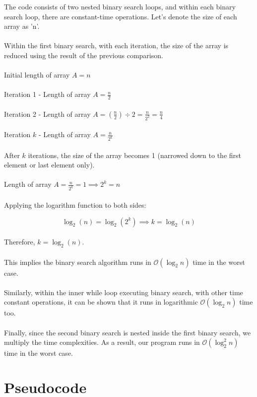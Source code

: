 \documentclass{article}
\begin{document}
{{The code consists of two nested binary search loops, and within each binary search loop, there are constant-time operations. Let's denote the size of each array as 'n'.
\\ \\
Within the first binary search, with each iteration, the size of the array is reduced using the result of the previous comparison.
\\ \\
Initial length of array \(A = n\)
\\ \\
Iteration 1 - Length of array \(A = \frac{n}{2}\)
\\ \\
Iteration 2 - Length of array \(A = \left(\frac{n}{2}\right) \div 2 = \frac{n}{2^2} = \frac{n}{4}\)
\\ \\
Iteration \(k\) - Length of array \(A = \frac{n}{2^k}\)
\\ \\
After \(k\) iterations, the size of the array becomes 1 (narrowed down to the first element or last element only).
\\ \\
Length of array \(A = \frac{n}{2^k} = 1 \implies 2^k = n\)
\\ \\
Applying the logarithm function to both sides:

\[
\log_2(n) = \log_2(2^k) \implies k = \log_2(n)
\]
\\
Therefore, \(k = \log_2(n)\).
\\ \\ 
This implies the binary search algorithm runs in $\mathcal{O}(\log_2 n)$ time in the worst case.
\\ \\
Similarly, within the inner while loop executing binary search, with other time constant operations, it can be shown that it runs in logarithmic $\mathcal{O}(\log_2 n)$ time too.
\\ \\
Finally, since the second binary search is nested inside the first binary search, we multiply the time complexities. As a result, our program runs in $\mathcal{O}(\log_2^2 n)$ time in the worst case.

}

\section*{\huge{Pseudocode}}

}
\end{document}
